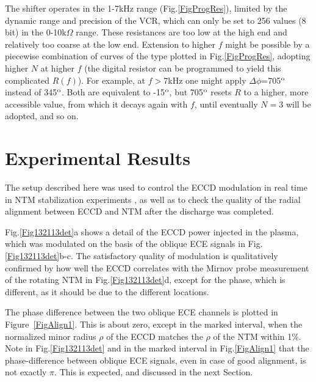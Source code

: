 \documentclass[aps,pra,twocolumn]{revtex4}
\begin{document}
The shifter operates in the 1-7kHz range (Fig.\ref{FigProgRes}),
limited by the dynamic range and precision of the VCR, which  can only
be set to 256 values (8 bit) in the 0-10k$\Omega$  range. These
resistances are too low at the high end and  relatively too coarse at
the low end.  Extension to higher $f$ might be possible by   a
piecewise combination of curves of the type plotted in
Fig.\ref{FigProgRes},  adopting higher $N$ at higher $f$ (the digital
resistor can be  programmed to yield this complicated $R(f)$).   For
example, at $f>$7kHz one might apply $\Delta \phi$=705$^{\rm o}$
instead of 345$^{\rm o}$. Both are equivalent to -15$^{\rm o}$, but
705$^{\rm o}$ resets $R$ to a higher, more accessible value, from
which it  decays again with $f$, until eventually $N=3$ will be
adopted, and so on. 



\section{Experimental Results}                             \label{SecResults}
The setup described here was used to 
control the ECCD modulation in real time in NTM stabilization 
experiments \cite{PoP}, as well as to check the quality of 
the radial alignment between ECCD and NTM after the discharge was completed. 

Fig.\ref{Fig132113det}a shows a detail of the ECCD power injected in the 
plasma, which was modulated on the basis of the oblique ECE signals in 
Fig.\ref{Fig132113det}b-c. The satisfactory 
quality of modulation is qualitatively confirmed by how well the ECCD
correlates with the Mirnov probe measurement of the rotating NTM 
in Fig.\ref{Fig132113det}d, except for the phase, which is
different, as it should be due to the different locations. 

The phase difference between the two oblique ECE channels is plotted in 
Figure~\ref{FigAlign1}. This is about zero, except in the marked 
interval, when the normalized minor radius 
$\rho$ of the ECCD matches the $\rho$ of the NTM within 1\%. 
Note in Fig.\ref{Fig132113det} and in the marked interval in 
Fig.\ref{FigAlign1} that the phase-difference between oblique ECE 
signals, even in case of good alignment, is not exactly $\pi$. This is 
expected, and discussed in the next Section. 
\end{document}
